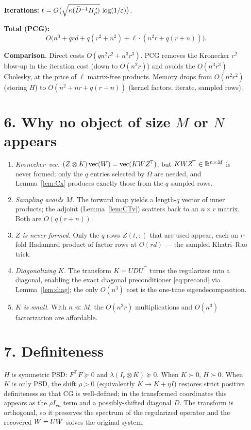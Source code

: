 \documentclass[11pt]{article}
\begin{document}
\textbf{Iterations:}
$\ell=O\bigl(\sqrt{\kappa(\bar D^{-1}H_\rho^{\,\prime})}\,\log(1/\varepsilon)\bigr)$.

\textbf{Total (PCG):}
\[
  O\bigl(n^3 + qrd + q(r^2+n^2) + \ell\cdot(n^2r+q(r+n))\bigr).
\]

\textbf{Comparison.} Direct costs $O(qn^2r^2+n^3r^3)$. PCG removes the
Kronecker $r^2$ blow-up in the iteration cost (down to $O(n^2r)$) and avoids
the $O(n^3r^3)$ Cholesky, at the price of $\ell$ matrix-free products. Memory
drops from $O(n^2r^2)$ (storing $H$) to $O(n^2+nr+q(r+n))$ (kernel factors,
iterate, sampled rows).

\section*{6. Why no object of size \texorpdfstring{$M$}{M} or \texorpdfstring{$N$}{N} appears}

\begin{enumerate}\setlength\itemsep{4pt}
\item \emph{Kronecker--vec.} $(Z\otimes K)\operatorname{vec}(W)=\operatorname{vec}(KWZ^{\!\top})$, but
$KWZ^{\!\top}\in\mathbb{R}^{n\times M}$ is never formed; only the $q$ entries selected
by $\Omega$ are needed, and Lemma~\ref{lem:Cx} produces exactly those from the
$q$ sampled rows.
\item \emph{Sampling avoids $M$.} The forward map yields a length-$q$ vector of
inner products; the adjoint (Lemma~\ref{lem:CTv}) scatters back to an
$n\times r$ matrix. Both are $O(q(r+n))$.
\item \emph{$Z$ is never formed.} Only the $q$ rows $\widehat Z(t,:)$ that are
used appear, each an $r$-fold Hadamard product of factor rows at $O(rd)$ — the
sampled Khatri--Rao trick.
\item \emph{Diagonalizing $K$.} The transform $K=UDU^{\!\top}$ turns the
regularizer into a diagonal, enabling the exact diagonal preconditioner
\eqref{eq:precond} via Lemma~\ref{lem:diag}; the only $O(n^3)$ cost is the
one-time eigendecomposition.
\item \emph{$K$ is small.} With $n\ll M$, the $O(n^2r)$ multiplications and
$O(n^3)$ factorization are affordable.
\end{enumerate}

\section*{7. Definiteness}

$H$ is symmetric PSD: $F^{\!\top}F\succeq0$ and $\lambda(I_r\otimes K)\succeq0$.
When $K\succ0$, $H\succ0$. When $K$ is only PSD, the shift $\rho>0$ (equivalently
$K\to K+\eta I$) restores strict positive definiteness so that CG is
well-defined; in the transformed coordinates this appears as the
$\rho I_{rn}$ term and a possibly-shifted diagonal $D$. The transform is
orthogonal, so it preserves the spectrum of the regularized operator and the
recovered $W=U\bar W$ solves the original system.
\end{document}
